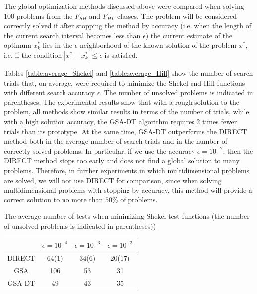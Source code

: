 \documentclass[entropy,article,submit,moreauthors,pdftex]{Definitions/mdpi}
\begin{document}
The global optimization methods discussed above were compared when solving 100 problems from the  $F_{SH}$ and $F_{HL}$ classes. The problem will be considered correctly solved if after stopping the method by accuracy (i.e. when the length of the current search interval becomes less than $\epsilon$) the current estimate of the optimum  $x_k^*$ lies in the $\epsilon$-neighborhood of the known solution of the problem  $x^*$, i.e. if the condition  $|x^*-x_k^*| \leq \epsilon$ is satisfied.

Tables \ref{table:average_Shekel} and \ref{table:average_Hill} show the number of search trials that, on average, were required to minimize the Shekel and Hill functions with different search accuracy  $\epsilon$. The number of unsolved problems is indicated in parentheses. The experimental results show that with a rough solution to the problem, all methods show similar results in terms of the number of trials, while with a high solution accuracy, the GSA-DT algorithm requires 2 times fewer trials than its prototype. At the same time, GSA-DT outperforms the DIRECT method both in the average number of search trials and in the number of correctly solved problems. In particular, if we use the accuracy $\epsilon = 10^{-2}$, then the DIRECT method stops too early and does not find a global solution to many problems. 
Therefore, in further experiments in which multidimensional problems are solved, we will not use DIRECT for comparison, since when solving multidimensional problems with stopping by accuracy, this method will provide a correct solution to no more than  $50\%$ of problems. 

\begin{specialtable}[H] 
	\caption{The average number of tests when minimizing Shekel test functions (the number of unsolved problems is indicated in parentheses))}\label{table:average_Shekel}
	\center
\begin{tabular}{cccc}
\toprule
        & \textbf{$\epsilon = 10^{-4}$} & \textbf{$\epsilon = 10^{-3}$} & \textbf{$\epsilon = 10^{-2}$} \\
\midrule													
DIRECT         & 64(1) &  34(6)   & 20(17)    \\
GSA            & 106  & 53  &  31   \\ 
GSA-DT         & 49   & 43  &  35   \\

\bottomrule
\end{tabular}
\end{specialtable}
\end{document}

